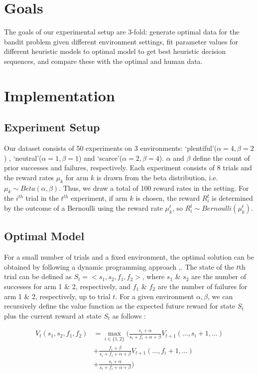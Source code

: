 \section{Goals}
The goals of our experimental setup are 3-fold: generate optimal data for the bandit problem given different environment settings, fit parameter values for different heuristic models to optimal model to get best heuristic decision sequences, and compare these with the optimal and human data.

\section{Implementation}
\subsection{Experiment Setup}
Our dataset \cite{data} consists of 50 experiments on 3 environments: ‘plentiful’($\alpha=4,\beta=2$) , ‘neutral’($\alpha=1,\beta=1$) and ‘scarce’($\alpha=2,\beta=4$). $\alpha$ and $\beta$ define the count of prior successes and failures, respectively. Each experiment consists of 8 trials and the reward rates $\mu_k$ for arm $k$ is drawn from the beta distribution, i.e. $\mu_k \sim Beta (\alpha, \beta)$. Thus, we draw a total of 100 reward rates in the setting. For the $i^{th}$ trial in the $t^{th}$ experiment, if arm $k$ is chosen, the reward $R_i^t$ is determined by the outcome of a Bernoulli using the reward rate $\mu_k^t$, so $R_i^t \sim Bernoulli (\mu_k^t)$.

\subsection{Optimal Model}
For a small number of trials and a fixed environment, the optimal solution can be obtained by following a dynamic programming approach \cite{kaelbling},\cite{steyvers}. The state of the $t$th trial can be defined as $S_t = <s_1,s_2,f_1,f_2>$, where $s_1$ \& $s_2$ are the number of successes for arm 1 \& 2, respectively, and $f_1$ \& $f_2$ are the number of failures for arm 1 \& 2, respectively, up to trial $t$. For a given environment $\alpha,\beta$, we can recursively define the value function as the expected future reward for state $S_t$ plus the current reward at state $S_t$ as follows : 

\begin{align*}
	V_t(s_1,s_2,f_1,f_2) &= \max_{i \in \{1,2\}} 
	\Big(
	\frac{s_i + \alpha}{s_i + f_i + \alpha + \beta} V_{t+1}(...,s_i+1,...) \\
	&+ \frac{f_i + \beta}{s_i + f_i + \alpha + \beta} V_{t+1}(...,f_i+1,...)\\
	&+ \frac{s_i + \alpha}{s_i + f_i + \alpha + \beta} 
	\Big)	
\end{align*}


